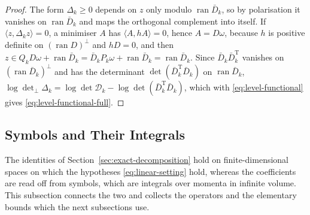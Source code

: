 \documentclass[11pt]{preprint}
\numberwithin{equation}{section}
\theoremstyle{definition}
\theoremstyle{remark}
\theoremstyle{plain}
\begin{document}
\begin{proof}
The form $\Delta_k \geq 0$ depends on $z$ only modulo $\operatorname{ran}\bar D_k$, so by polarisation it vanishes on $\operatorname{ran}\bar D_k$ and maps the orthogonal complement into itself. If $\langle z, \Delta_kz \rangle = 0$, a minimiser $A$ has $\langle A, hA \rangle = 0$, hence $A = D\omega$, because $h$ is positive definite on $(\operatorname{ran}D)^\perp$ and $hD = 0$, and then $z \in Q_kD\omega + \operatorname{ran}\bar D_k = \bar D_kP_k\omega + \operatorname{ran}\bar D_k = \operatorname{ran}\bar D_k$. Since $\bar D_k\bar D_k^{\mathrm T}$ vanishes on $(\operatorname{ran}\bar D_k)^\perp$ and has the determinant $\det(\bar D_k^{\mathrm T}\bar D_k)$ on $\operatorname{ran}\bar D_k$, $\log\det_\perp\Delta_k = \log\det\mathcal D_k - \log\det(\bar D_k^{\mathrm T}\bar D_k)$, which with \eqref{eq:level-functional} gives \eqref{eq:level-functional-full}.
\end{proof}

\subsection{Symbols and Their Integrals}\label{sec:symbols}

The identities of Section~\ref{sec:exact-decomposition} hold on finite-dimensional spaces on which the hypotheses \eqref{eq:linear-setting} hold, whereas the coefficients are read off from symbols, which are integrals over momenta in infinite volume. This subsection connects the two and collects the operators and the elementary bounds which the next subsections use.
\end{document}
